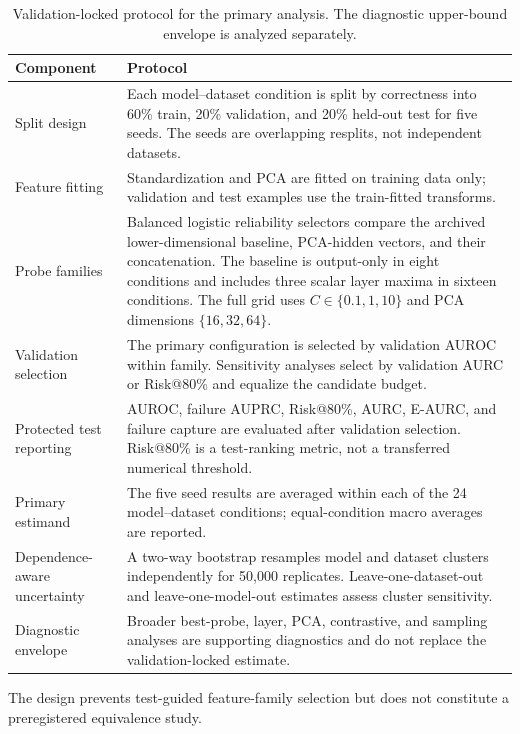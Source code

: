 \begin{table}[t]
\centering
\small
\caption{Validation-locked protocol for the primary analysis. The diagnostic upper-bound envelope is analyzed separately.}
\label{tab:locked-protocol}
\begin{threeparttable}
\begin{tabularx}{\textwidth}{p{}X}
\toprule
Component & Protocol \\
\midrule
Split design & Each model--dataset condition is split by correctness into 60\% train, 20\% validation, and 20\% held-out test for five seeds. The seeds are overlapping resplits, not independent datasets. \\
Feature fitting & Standardization and PCA are fitted on training data only; validation and test examples use the train-fitted transforms. \\
Probe families & Balanced logistic reliability selectors compare the archived lower-dimensional baseline, PCA-hidden vectors, and their concatenation. The baseline is output-only in eight conditions and includes three scalar layer maxima in sixteen conditions. The full grid uses $C\in\{0.1,1,10\}$ and PCA dimensions $\{16,32,64\}$. \\
Validation selection & The primary configuration is selected by validation AUROC within family. Sensitivity analyses select by validation AURC or Risk@80\% and equalize the candidate budget. \\
Protected test reporting & AUROC, failure AUPRC, Risk@80\%, AURC, E-AURC, and failure capture are evaluated after validation selection. Risk@80\% is a test-ranking metric, not a transferred numerical threshold. \\
Primary estimand & The five seed results are averaged within each of the 24 model--dataset conditions; equal-condition macro averages are reported. \\
Dependence-aware uncertainty & A two-way bootstrap resamples model and dataset clusters independently for 50,000 replicates. Leave-one-dataset-out and leave-one-model-out estimates assess cluster sensitivity. \\
Diagnostic envelope & Broader best-probe, layer, PCA, contrastive, and sampling analyses are supporting diagnostics and do not replace the validation-locked estimate. \\
\bottomrule
\end{tabularx}
\begin{tablenotes}[flushleft]\footnotesize\item The design prevents test-guided feature-family selection but does not constitute a preregistered equivalence study.\end{tablenotes}
\end{threeparttable}
\end{table}
